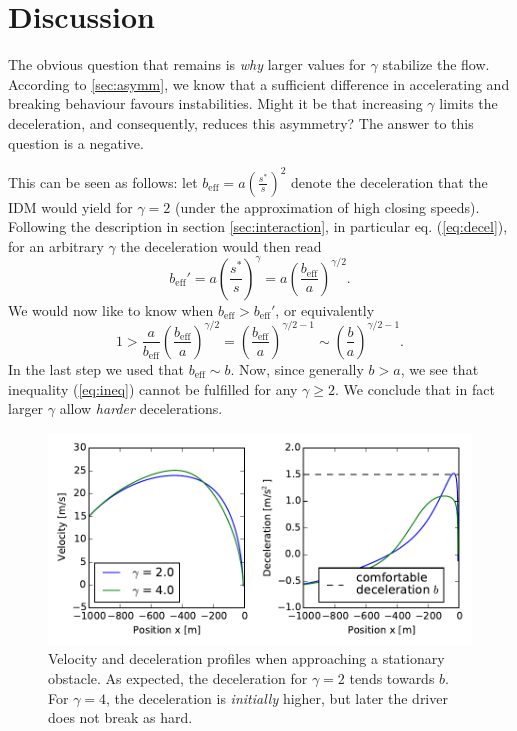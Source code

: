 \section{Discussion}
The obvious question that remains is \emph{why} larger values for $\gamma$ stabilize the flow. According to \ref{sec:asymm}, we know that a sufficient difference in accelerating and breaking behaviour favours instabilities. Might it be that increasing $\gamma$ limits the deceleration, and consequently, reduces this asymmetry? The answer to this question is a negative. 

This can be seen as follows: let $b_\mathrm{eff} = a\left(\frac{s^*}{s}\right)^2$ denote the deceleration that the IDM would yield for $\gamma=2$ (under the approximation of high closing speeds). 
Following the description in section \ref{sec:interaction}, in particular eq. (\ref{eq:decel}), for an arbitrary $\gamma$ the deceleration would then read
\begin{equation}
    b_\mathrm{eff}' = a\left(\frac{s^*}{s}\right)^\gamma = a \left(\frac{b_\mathrm{eff}}{a}\right)^{\gamma/2}.
\end{equation}
We would now like to know when $b_\mathrm{eff}>b_\mathrm{eff}'$, or equivalently
\begin{equation}
1>\frac{a}{b_\mathrm{eff}} \left(\frac{b_\mathrm{eff}}{a}\right)^{\gamma/2} = \left(\frac{b_\mathrm{eff}}{a}\right)^{\gamma/2-1}\sim\left(\frac{b}{a}\right)^{\gamma/2-1}.
\label{eq:ineq}
\end{equation}
In the last step we used that $b_\mathrm{eff}\sim b$. Now, since generally $b>a$, we see that inequality (\ref{eq:ineq}) cannot be fulfilled for any $\gamma\ge 2$. We conclude that in fact larger $\gamma$ allow \emph{harder} decelerations.

\begin{figure}
    \centering
    \includegraphics[width=5in]{../img/vel_profile.pdf}
    \caption{Velocity and deceleration profiles when approaching a stationary obstacle. As expected, the deceleration for $\gamma=2$ tends towards $b$. For $\gamma=4$, the deceleration is \emph{initially} higher, but later the driver does not break as hard.}
    \label{fig:vel_profile}
\end{figure}

